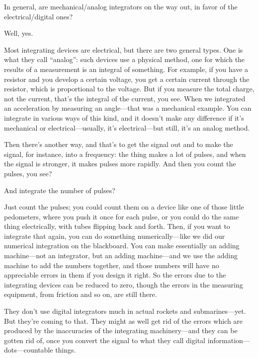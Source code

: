 \documentclass[11pt,oneside]{article}
\begin{document}
In general, are mechanical/analog integrators on the way out, in favor of the electrical/digital ones?\par

Well, yes.\par

Most integrating devices are electrical, but there are two general types. One is what they call ``analog'': such devices use a physical method, one for which the results of a measurement is an integral of something. For example, if you have a resistor and you develop a certain voltage, you get a certain current through the resistor, which is proportional to the voltage. But if you measure the total charge, not the current, that's the integral of the current, you see. When we integrated an acceleration by measuring an angle---that was a mechanical example. You can integrate in various ways of this kind, and it doesn't make any difference if it's mechanical or electrical---usually, it's electrical---but still, it's an analog method.\par

Then there's another way, and that's to get the signal out and to make the signal, for instance, into a frequency: the thing makes a lot of pulses, and when the signal is stronger, it makes pulses more rapidly. And then you count the pulses, you see?\par

And integrate the number of pulses?\par

Just count the pulses; you could count them on a device like one of those little pedometers, where you push it once for each pulse, or you could do the same thing electrically, with tubes flipping back and forth. Then, if you want to integrate that again, you can do something numerically---like we did our numerical integration on the blackboard. You can make essentially an adding machine---not an integrator, but an adding machine---and we use the adding machine to add the numbers together, and those numbers will have no appreciable errors in them if you design it right. So the errors due to the integrating devices can be reduced to zero, though the errors in the measuring equipment, from friction and so on, are still there.\par

They don't use digital integrators much in actual rockets and submarines---yet. But they're coming to that. They might as well get rid of the errors which are produced by the inaccuracies of the integrating machinery---and they can be gotten rid of, once you convert the signal to what they call digital information---dots---countable things.\par
\end{document}
